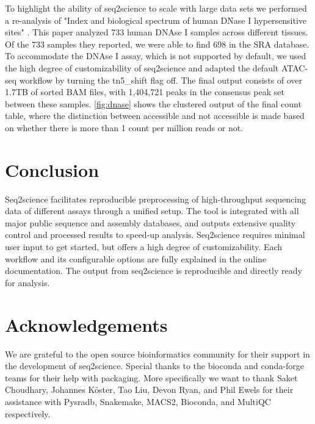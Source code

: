 To highlight the ability of seq2science to scale with large data sets we performed a re-analysis of "Index and biological spectrum of human DNase I hypersensitive sites" \cite{Meuleman2020}. This paper analyzed 733 human DNAse I samples across different tissues. Of the 733 samples they reported, we were able to find 698 in the SRA database. To accommodate the DNAse I assay, which is not supported by default, we used the high degree of customizability of seq2science and adapted the default ATAC-seq workflow by turning the tn5\_shift flag off. The final output consists of over 1.7TB of sorted BAM files, with 1,404,721 peaks in the consensus peak set between these samples. \autoref{fig:dnase} shows the clustered output of the final count table, where the distinction between accessible and not accessible is made based on whether there is more than 1 count per million reads or not.

\section{Conclusion}

Seq2science facilitates reproducible preprocessing of high-throughput sequencing data of different assays through a unified setup. The tool is integrated with all major public sequence and assembly databases, and outputs extensive quality control and processed results to speed-up analysis. Seq2science requires minimal user input to get started, but offers a high degree of customizability. Each workflow and its configurable options are fully explained in the online documentation. The output from seq2science is reproducible and directly ready for analysis.

\section{Acknowledgements}

We are grateful to the open source bioinformatics community for their support in the development of seq2science. Special thanks to the bioconda and conda-forge teams for their help with packaging. More specifically we want to thank Saket Choudhary, Johannes K{\"o}ster, Tao Liu, Devon Ryan, and Phil Ewels for their assistance with Pysradb, Snakemake, MACS2, Bioconda, and MultiQC respectively. 
